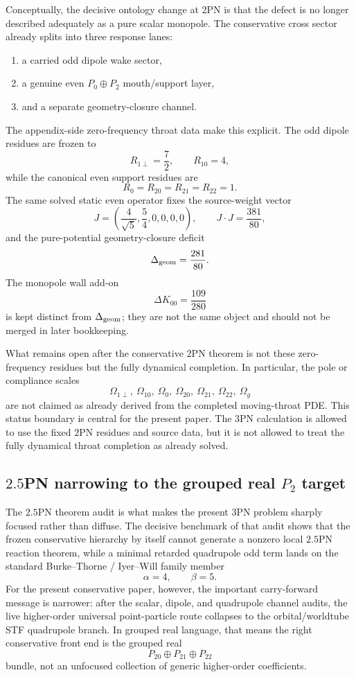 \documentclass[11pt]{article}
\begin{document}
Conceptually, the decisive ontology change at $2$PN is that the defect is no
 longer described adequately as a pure scalar monopole.  The conservative cross
 sector already splits into three response lanes:
\begin{enumerate}
  \item a carried odd dipole wake sector,
  \item a genuine even $P_0\oplus P_2$ mouth/support layer,
  \item and a separate geometry-closure channel.
\end{enumerate}
The appendix-side zero-frequency throat data make this explicit.  The odd dipole
 residues are frozen to
\[
R_{1\perp}=\frac72,
\qquad
R_{10}=4,
\]
while the canonical even support residues are
\[
R_0=R_{20}=R_{21}=R_{22}=1.
\]
The same solved static even operator fixes the source-weight vector
\[
J=\left(\frac{4}{\sqrt5},\frac54,0,0,0,0\right),
\qquad
J\cdot J=\frac{381}{80},
\]
and the pure-potential geometry-closure deficit
\[
\Delta_{\rm geom}=\frac{281}{80}.
\]
The monopole wall add-on
\[
\Delta K_{00}=\frac{109}{280}
\]
is kept distinct from $\Delta_{\rm geom}$; they are not the same object and
 should not be merged in later bookkeeping.

What remains open after the conservative $2$PN theorem is not these
 zero-frequency residues but the fully dynamical completion.  In particular, the
 pole or compliance scales
\[
\Omega_{1\perp},\ \Omega_{10},\ \Omega_0,
\ \Omega_{20},\ \Omega_{21},\ \Omega_{22},\ \Omega_g
\]
are not claimed as already derived from the completed moving-throat PDE.  This
 status boundary is central for the present paper.  The $3$PN calculation is
 allowed to use the fixed $2$PN residues and source data, but it is not allowed
 to treat the fully dynamical throat completion as already solved.

\subsection{\texorpdfstring{$2.5$}{2.5}PN narrowing to the grouped real \texorpdfstring{$P_2$}{P 2} target}
\label{app:carry-forward-25pn}

The $2.5$PN theorem audit is what makes the present $3$PN problem sharply
 focused rather than diffuse.  The decisive benchmark of that audit shows that
 the frozen conservative hierarchy by itself cannot generate a nonzero local
 $2.5$PN reaction theorem, while a minimal retarded quadrupole odd term lands on
 the standard Burke--Thorne / Iyer--Will family member
\[
\alpha=4,
\qquad
\beta=5.
\]
For the present conservative paper, however, the important carry-forward message
 is narrower: after the scalar, dipole, and quadrupole channel audits, the live
 higher-order universal point-particle route collapses to the orbital/worldtube
 STF quadrupole branch.  In grouped real language, that means the right
 conservative front end is the grouped real
\[
P_{20}\oplus P_{21}\oplus P_{22}
\]
bundle, not an unfocused collection of generic higher-order coefficients.
\end{document}

